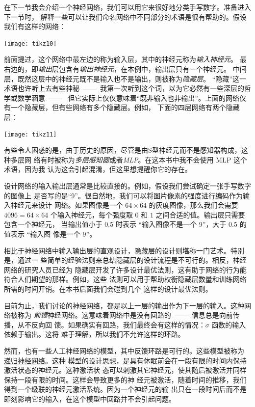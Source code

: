 在下一节我会介绍一个神经网络，我们可以用它来很好地分类手写数字。准备进入下一节时，
解释一些可以让我们命名网络中不同部分的术语是很有帮助的。假设我们有这样的网络：
\begin{center}
  \texttt{[image: tikz10]}
\end{center}

前面提过，这个网络中最左边的称为输入层，其中的神经元称为\emph{输入神经元}。
最右边的，即\emph{输出}层包含有\emph{输出神经元}，在本例中，输出层只有一个神经元。
中间层，既然这层中的神经元既不是输入也不是输出，则被称为\emph{隐藏层}。
“隐藏”这一术语也许听上去有些神秘~——~我第一次听到这个词，以为它必然有一些深层的哲学或数学涵意~——~
但它实际上仅仅意味着“既非输入也非输出”。上面的网络仅有一个隐藏层，但有些网络有多个隐藏层。例如，
下面的四层网络有两个隐藏层：
\begin{center}
  \texttt{[image: tikz11]}
\end{center}

有些令人困惑的是，由于历史的原因，尽管是由S型神经元而不是感知器构成，这种多层网
络有时被称为\emph{多层感知器}或者\emph{MLP}。在这本书中我不会使用 MLP 这个术语，因为我
认为这会引起混淆，但这里想提醒你它的存在。

设计网络的输入输出层通常是比较直接的。例如，假设我们尝试确定一张手写数字的图像上
是否写的是“9”。很自然地，我们可以将图片像素的强度进行编码作为输入神经元来设计
网络。如果图像是一个 $64 \times 64$ 的灰度图像，那么我们会需要 $4096 = 64 \times
64$ 个输入神经元，每个强度取 $0$ 和 $1$ 之间合适的值。输出层只需要包含一个神经元，
当输出值小于 $0.5$ 时表示 “输入图像不是一个 $9$”，大于 $0.5$ 的值表示 “输入图
像是一个 $9$”。

相比于神经网络中输入输出层的直观设计，隐藏层的设计则堪称一门艺术。特别是，通过一
些简单的经验法则来总结隐藏层的设计流程是不可行的。相反，神经网络的研究人员已经为
隐藏层开发了许多设计最优法则，这有助于网络的行为能符合人们期望的那样。例如，这些
法则可以用于帮助权衡隐藏层数量和训练网络所需的时间开销。在本书后面我们会碰到几个
这样的设计最优法则。

目前为止，我们讨论的神经网络，都是以上一层的输出作为下一层的输入。这种网络被称为
\emph{前馈}神经网络。这意味着网络中是没有回路的~——~信息总是向前传播，从不反向回
馈。如果确实有回路，我们最终会有这样的情况：$\sigma$ 函数的输入依赖于输出。这将
难于理解，所以我们不允许这样的环路。

然而，也有一些人工神经网络的模型，其中反馈环路是可行的。这些模型被称为%
\href{http://en.wikipedia.org/wiki/Recurrent_neural_network}{递归神经网络}。这种
模型的设计思想，是具有休眠前会在一段有限的时间内保持激活状态的神经元。这种激活状
态可以刺激其它神经元，使其随后被激活并同样保持一段有限的时间。这样会导致更多的神
经元被激活，随着时间的推移，我们得到一个级联的神经元激活系统。因为一个神经元的输
出只在一段时间后而不是即刻影响它的输入，在这个模型中回路并不会引起问题。

